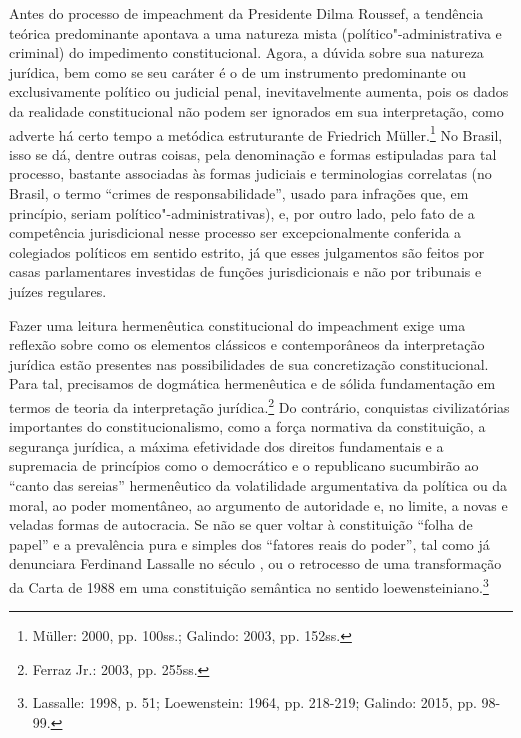 Antes do processo de impeachment da Presidente Dilma Roussef, a
tendência teórica predominante apontava a uma natureza mista
(político"-administrativa e criminal) do impedimento constitucional.
Agora, a dúvida sobre sua natureza jurídica, bem como se seu caráter é o
de um instrumento predominante ou exclusivamente político ou judicial
penal, inevitavelmente aumenta, pois os dados da realidade
constitucional não podem ser ignorados em sua interpretação, como
adverte há certo tempo a metódica estruturante de Friedrich Müller.\footnote{Müller: 2000, pp. 100ss.; Galindo: 2003, pp. 152ss.} No Brasil, isso
se dá, dentre outras coisas, pela denominação e formas estipuladas para
tal processo, bastante associadas às formas judiciais e terminologias
correlatas (no Brasil, o termo ``crimes de responsabilidade'', usado
para infrações que, em princípio, seriam político"-administrativas), e,
por outro lado, pelo fato de a competência jurisdicional nesse processo
ser excepcionalmente conferida a colegiados políticos em sentido
estrito, já que esses julgamentos são feitos por casas parlamentares
investidas de funções jurisdicionais e não por tribunais e juízes
regulares.

Fazer uma leitura hermenêutica constitucional do impeachment
exige uma reflexão sobre como os elementos clássicos e contemporâneos da
interpretação jurídica estão presentes nas possibilidades de sua
concretização constitucional. Para tal, precisamos de dogmática
hermenêutica e de sólida fundamentação em termos de teoria da
interpretação jurídica.\footnote{Ferraz Jr.: 2003, pp. 255ss.} Do contrário,
conquistas civilizatórias importantes do constitucionalismo, como a
força normativa da constituição, a segurança jurídica, a máxima
efetividade dos direitos fundamentais e a supremacia de princípios como
o democrático e o republicano sucumbirão ao ``canto das sereias''
hermenêutico da volatilidade argumentativa da política ou da moral, ao
poder momentâneo, ao argumento de autoridade e, no limite, a novas e
veladas formas de autocracia. Se não se quer voltar à constituição
``folha de papel'' e a prevalência pura e simples dos ``fatores reais do
poder'', tal como já denunciara Ferdinand Lassalle no século , ou o
retrocesso de uma transformação da Carta de 1988 em uma constituição
semântica no sentido loewensteiniano.\footnote{Lassalle: 1998, p. 51;
Loewenstein: 1964, pp. 218-219; Galindo: 2015, pp. 98-99.}

